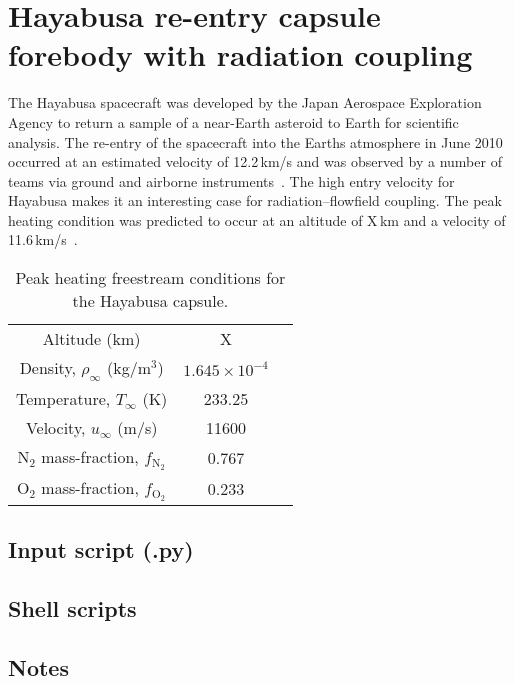 
\section{Hayabusa re-entry capsule forebody with radiation coupling}
\label{sec:hayabusa}
%
The Hayabusa spacecraft was developed by the Japan Aerospace Exploration Agency to return a sample of a near-Earth asteroid to Earth for scientific analysis.
The re-entry of the spacecraft into the Earths atmosphere in June 2010 occurred at an estimated velocity of 12.2\,km/s and was observed by a number of teams via ground and airborne instruments~\cite{butts_2010}.
The high entry velocity for Hayabusa makes it an interesting case for radiation--flowfield coupling.
The peak heating condition was predicted to occur at an altitude of X\,km and a velocity of 11.6\,km/s~\cite{SFA2003}.

\begin{table}[h]
 \small
 \centering
 \caption{Peak heating freestream conditions for the Hayabusa capsule. }
 \label{tab:hayabusa_effective_flight}
 \begin{tabular*}{0.5\textwidth}{ccc}
  \hline Altitude (km)                                                            & X\\
             Density,  $\rho_\infty$ (kg/m$^3$)                      & $1.645 \times 10^{-4}$   \\
             Temperature, $T_\infty$ (K)                                 & 233.25         \\
             Velocity, $u_\infty$ (m/s)                                      & 11600  \\
             N$_2$ mass-fraction, $f_\text{N$_2$}$            & 0.767 \\
             O$_2$ mass-fraction, $f_\text{O$_2$}$            & 0.233 \\
  \hline
 \end{tabular*}
\end{table}

\newpage

\subsection{Input script (.py)}
\topbar

\bottombar

\subsection{Shell scripts}
\topbar

\bottombar

\subsection{Notes}
